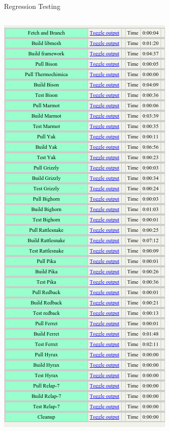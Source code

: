 \documentclass[mathserif]{beamer}
\begin{document}
\begin{frame}[t]{Regression Testing}
  \begin{columns}
    \includegraphics[width=\textwidth]{moose_tests}


\end{columns}
\end{frame}
\end{document}
